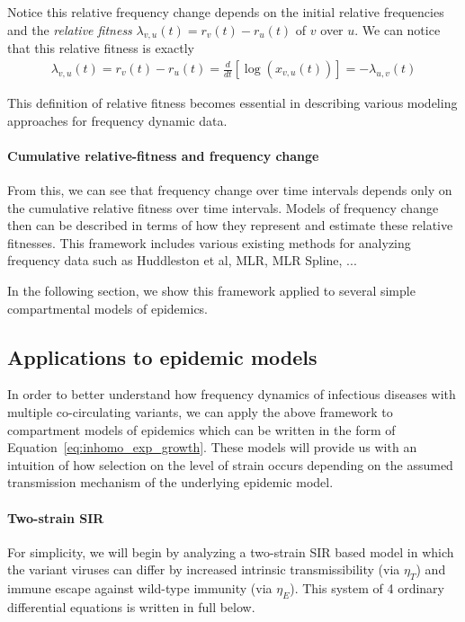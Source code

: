 \documentclass[12pt,oneside,letterpaper]{article}
\begin{document}
Notice this relative frequency change depends on the initial relative frequencies and the \emph{relative fitness} $\lambda_{v,u}(t) = r_{v}(t) - r_{u}(t)$ of $v$ over $u$.
We can notice that this relative fitness is exactly
\begin{align}
\lambda_{v, u}(t) = r_{v}(t) - r_{u}(t) = \frac{d }{d t} \left[\log \left( x_{v,u}(t) \right) \right] = - \lambda_{u,v}(t)
\end{align}

This definition of relative fitness becomes essential in describing various modeling approaches for frequency dynamic data.


\paragraph{Cumulative relative-fitness and frequency change}

From this, we can see that frequency change over time intervals depends only on the cumulative relative fitness over time intervals.
Models of frequency change then can be described in terms of how they represent and estimate these relative fitnesses.
This framework includes various existing methods for analyzing frequency data such as Huddleston et al, MLR, MLR Spline, ...

In the following section, we show this framework applied to several simple compartmental models of epidemics.

\subsection*{Applications to epidemic models}

In order to better understand how frequency dynamics of infectious diseases with multiple co-circulating variants, we can apply the above framework to compartment models of epidemics which can be written in the form of Equation~\ref{eq:inhomo_exp_growth}.
These models will provide us with an intuition of how selection on the level of strain occurs depending on the assumed transmission mechanism of the underlying epidemic model.

\paragraph{Two-strain SIR}%

For simplicity, we will begin by analyzing a two-strain SIR based model in which the variant viruses can differ by increased intrinsic transmissibility (via $\eta_{T}$) and immune escape against wild-type immunity (via $\eta_{E}$).
This system of 4 ordinary differential equations is written in full below.
\end{document}
